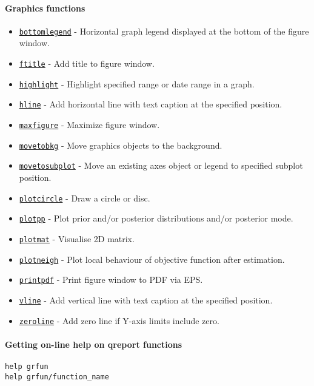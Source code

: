 

	\paragraph{Graphics functions}\label{graphics-functions}

\begin{itemize}
\itemsep1pt\parskip0pt
\item
  \href{grfun/bottomlegend}{\texttt{bottomlegend}} - Horizontal graph
  legend displayed at the bottom of the figure window.
\item
  \href{grfun/ftitle}{\texttt{ftitle}} - Add title to figure window.
\item
  \href{grfun/highlight}{\texttt{highlight}} - Highlight specified range
  or date range in a graph.
\item
  \href{grfun/hline}{\texttt{hline}} - Add horizontal line with text
  caption at the specified position.
\item
  \href{grfun/maxfigure}{\texttt{maxfigure}} - Maximize figure window.
\item
  \href{grfun/movetobkg}{\texttt{movetobkg}} - Move graphics objects to
  the background.
\item
  \href{grfun/movetosubplot}{\texttt{movetosubplot}} - Move an existing
  axes object or legend to specified subplot position.
\item
  \href{grfun/plotcircle}{\texttt{plotcircle}} - Draw a circle or disc.
\item
  \href{grfun/plotpp}{\texttt{plotpp}} - Plot prior and/or posterior
  distributions and/or posterior mode.
\item
  \href{grfun/plotmat}{\texttt{plotmat}} - Visualise 2D matrix.
\item
  \href{grfun/plotneigh}{\texttt{plotneigh}} - Plot local behaviour of
  objective function after estimation.
\item
  \href{grfun/printpdf}{\texttt{printpdf}} - Print figure window to PDF
  via EPS.
\item
  \href{grfun/vline}{\texttt{vline}} - Add vertical line with text
  caption at the specified position.
\item
  \href{grfun/zeroline}{\texttt{zeroline}} - Add zero line if Y-axis
  limits include zero.
\end{itemize}

\paragraph{Getting on-line help on qreport
functions}\label{getting-on-line-help-on-qreport-functions}

\begin{verbatim}
help grfun
help grfun/function_name
\end{verbatim}



